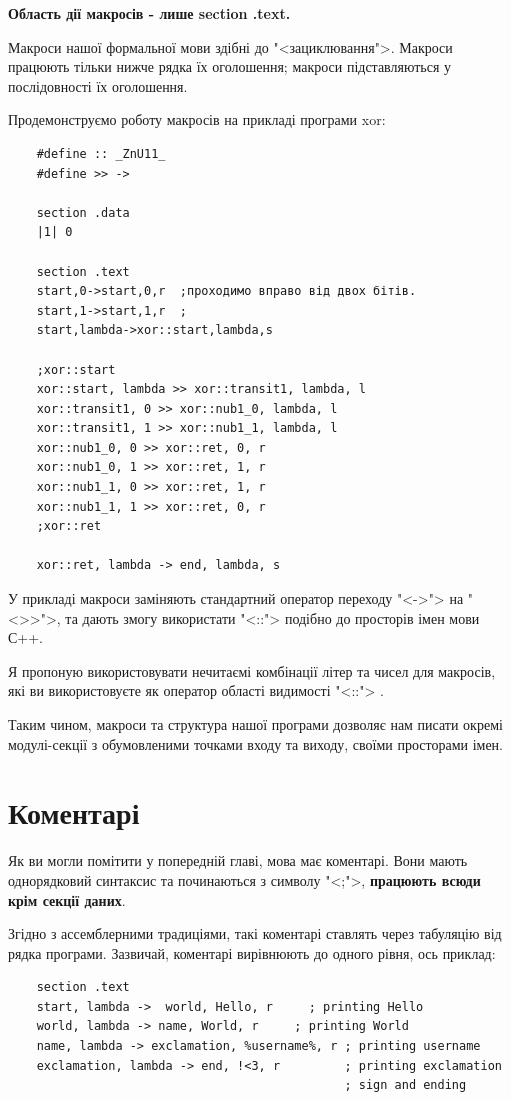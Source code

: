 \documentclass[oneside,final,14pt]{extreport}
\begin{document}
{\bfseries		
Область дії макросів - лише section .text. 

Макроси нашої формальної мови здібні до "<зациклювання">. Макроси працюють тільки нижче рядка їх оголошення; макроси підставляються у послідовності їх оголошення.
}

Продемонструємо роботу макросів на прикладі програми xor:	
\begin{verbatim}
	#define :: _ZnU11_
	#define >> ->

	section .data
	|1| 0

	section .text
	start,0->start,0,r	;проходимо вправо від двох бітів.
	start,1->start,1,r	;
	start,lambda->xor::start,lambda,s

	;xor::start
	xor::start, lambda >> xor::transit1, lambda, l 
	xor::transit1, 0 >> xor::nub1_0, lambda, l
	xor::transit1, 1 >> xor::nub1_1, lambda, l
	xor::nub1_0, 0 >> xor::ret, 0, r
	xor::nub1_0, 1 >> xor::ret, 1, r
	xor::nub1_1, 0 >> xor::ret, 1, r
	xor::nub1_1, 1 >> xor::ret, 0, r 
	;xor::ret

	xor::ret, lambda -> end, lambda, s
\end{verbatim}
У прикладі макроси заміняють стандартний оператор переходу "<->"> на "<>{}>">, та дають змогу використати "<::"> подібно до просторів імен мови С++.
		
Я пропоную використовувати нечитаємі комбінації літер та чисел для макросів, які ви використовуєте як оператор області видимості "<::"> .
		
Таким чином, макроси та структура нашої програми дозволяє нам писати окремі модулі-секції з обумовленими точками входу та виходу, своїми просторами імен.
\section{Коментарі}

Як ви могли помітити у попередній главі, мова має коментарі. Вони мають однорядковий синтаксис та починаються з символу "<;">, {\bfseries працюють всюди крім секції даних}.

Згідно з ассемблерними традиціями, такі коментарі ставлять через табуляцію від рядка програми. Зазвичай, коментарі вирівнюють до одного рівня, ось приклад:

\begin{Verbatim}
	section .text
	start, lambda ->  world, Hello, r	  ; printing Hello
	world, lambda -> name, World, r	    ; printing World
	name, lambda -> exclamation, %username%, r ; printing username
	exclamation, lambda -> end, !<3, r         ; printing exclamation
	                                           ; sign and ending
\end{Verbatim}
\end{document}
